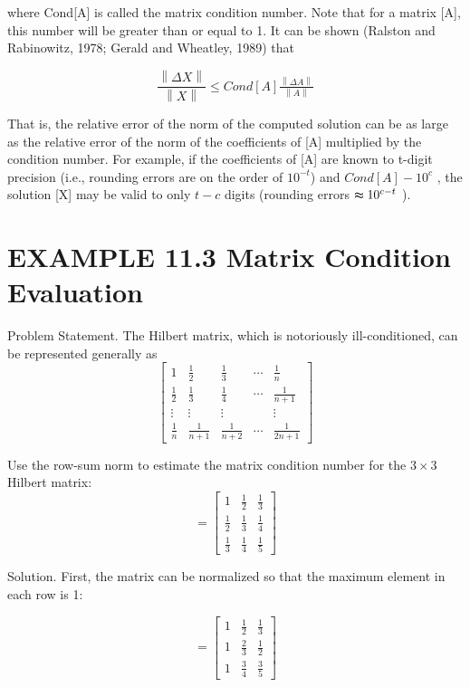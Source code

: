 \documentclass[../main.tex]{subfiles}
\begin{document}
where Cond[A] is called the matrix condition number. Note that for a matrix [A], this number will be greater than or equal to 1. It can be shown (Ralston and Rabinowitz, 1978; Gerald and Wheatley, 1989) that

$$ \frac{\left \| \Delta X \right \|}{\left \| X \right \|}\leq Cond[A]\tfrac{\left \| \Delta A \right \|}{\left \| A \right \|}$$

That is, the relative error of the norm of the computed solution can be as large as the relative error of the norm of the coefficients of [A] multiplied by the condition number. For example, if the coefficients of [A] are known to t-digit precision (i.e., rounding errors are on
the order of $10^{-t}$) and $Cond[A] - 10^{c}$ , the solution [X] may be valid to only $t - c$ digits (rounding errors $\thickapprox 10^{c-t}$ ).

\section*{EXAMPLE 11.3 Matrix Condition Evaluation}

Problem Statement. The Hilbert matrix, which is notoriously ill-conditioned, can be represented generally as
\begin{equation}
\begin{bmatrix}
1 &\frac{1}{2}  &\frac{1}{3}  & \cdots  &\frac{1}{n} \\ 
\frac{1}{2}  &\frac{1}{3}  &\frac{1}{4}  &\cdots  &\frac{1}{n+1} \\ 
\vdots &\vdots  &\vdots  &  &\vdots \\ 
\frac{1}{n} &\frac{1}{n+1}  &\frac{1}{n+2}  &\cdots   &\frac{1}{2n+1}
\end{bmatrix}
\end{equation}

Use the row-sum norm to estimate the matrix condition number for the $3\times3$ Hilbert matrix:
\begin{equation}
[A]=
\begin{bmatrix}
1 &\frac{1}{2}  &\frac{1}{3} \\
\frac{1}{2} &\frac{1}{3}  &\frac{1}{4} \\
\frac{1}{3} &\frac{1}{4}  &\frac{1}{5}
\end{bmatrix}
\end{equation}

Solution. First, the matrix can be normalized so that the maximum element in each row is 1:

\begin{equation}
[A]=
\begin{bmatrix}
1 &\frac{1}{2}  &\frac{1}{3} \\
1 &\frac{2}{3}  &\frac{1}{2} \\
1 &\frac{3}{4}  &\frac{3}{5}
\end{bmatrix}
\end{equation}
\end{document}
